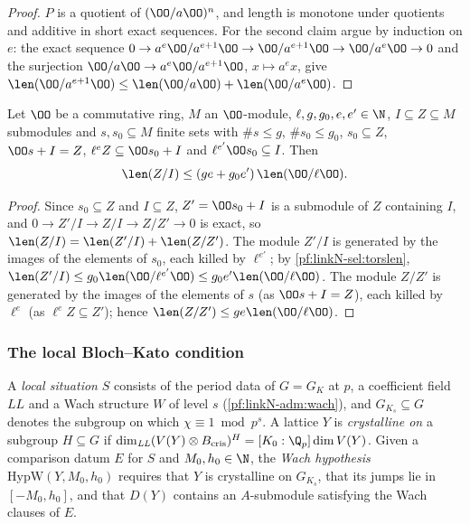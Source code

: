 \begin{proof}
$P$ is a quotient of $(\OO/a\OO)^n$, and length is monotone under quotients and additive in short exact sequences. For the second
claim argue by induction on $e$: the exact sequence $0\to a^e\OO/a^{e+1}\OO\to\OO/a^{e+1}\OO\to\OO/a^e\OO\to0$ and the surjection
$\OO/a\OO\to a^e\OO/a^{e+1}\OO$, $x\mapsto a^ex$, give $\len(\OO/a^{e+1}\OO)\le\len(\OO/a\OO)+\len(\OO/a^e\OO)$.
\end{proof}

\begin{lemma}\label{pf:linkN-sel:twostep}
Let $\OO$ be a commutative ring, $M$ an $\OO$-module, $\ell,g,g_0,e,e'\in\N$, $I\subseteq Z\subseteq M$ submodules and $s,s_0\subseteq M$
finite sets with $\#s\le g$, $\#s_0\le g_0$, $s_0\subseteq Z$, $\OO s+I=Z$, $\ell^eZ\subseteq\OO s_0+I$ and $\ell^{e'}\OO s_0\subseteq I$. Then
\[
\len(Z/I)\le(ge+g_0e')\,\len(\OO/\ell\OO).
\]
\end{lemma}

\begin{proof}
Since $s_0\subseteq Z$ and $I\subseteq Z$, $Z'=\OO s_0+I$ is a submodule of $Z$ containing $I$, and $0\to Z'/I\to Z/I\to Z/Z'\to0$ is exact,
so $\len(Z/I)=\len(Z'/I)+\len(Z/Z')$. The module $Z'/I$ is generated by the images of the elements of $s_0$, each killed by $\ell^{e'}$;
by \cref{pf:linkN-sel:torslen}, $\len(Z'/I)\le g_0\len(\OO/\ell^{e'}\OO)\le g_0e'\len(\OO/\ell\OO)$. The module $Z/Z'$ is generated by the
images of the elements of $s$ (as $\OO s+I=Z$), each killed by $\ell^e$ (as $\ell^eZ\subseteq Z'$); hence $\len(Z/Z')\le ge\len(\OO/\ell\OO)$.
\end{proof}

\subsubsection{The local Bloch--Kato condition}

A \emph{local situation} $S$ consists of the period data of $G=G_K$ at $p$, a coefficient field $\mathit{LL}$ and a Wach structure $W$ of
level $s$ (\cref{pf:linkN-adm:wach}), and $G_{K_s}\subseteq G$ denotes the subgroup on which $\chi\equiv1\bmod p^s$. A lattice $Y$ is
\emph{crystalline on} a subgroup $H\subseteq G$ if $\dim_{\mathit{LL}}(V(Y)\otimes B_{\mathrm{cris}})^H=[K_0:\Q_p]\dim V(Y)$. Given a
comparison datum $E$ for $S$ and $M_0,h_0\in\N$, the \emph{Wach hypothesis} $\mathrm{HypW}(Y,M_0,h_0)$ requires that $Y$ is crystalline on
$G_{K_s}$, that its jumps lie in $[-M_0,h_0]$, and that $D(Y)$ contains an $A$-submodule satisfying the Wach clauses of $E$.

